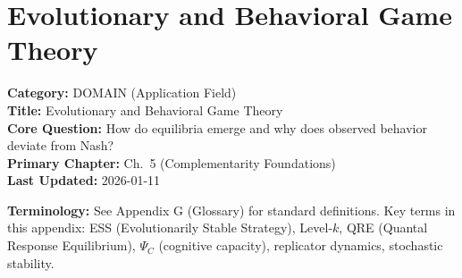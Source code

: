 \section{Evolutionary and Behavioral Game Theory}
\label{app:evolutionary-behavioral-gt}


\begin{tcolorbox}[colback=gray!5!white, colframe=gray!75!black,
    title=\textbf{Appendix: AD DOMAIN-EVGT}]
\textbf{Category:} DOMAIN (Application Field) \\
\textbf{Title:} Evolutionary and Behavioral Game Theory \\
\textbf{Core Question:} How do equilibria emerge and why does observed behavior deviate from Nash? \\
\textbf{Primary Chapter:} Ch.\ 5 (Complementarity Foundations) \\
\textbf{Last Updated:} 2026-01-11
\end{tcolorbox}

\begin{tcolorbox}[colback=gray!5!white, colframe=gray!50!black]
\textbf{Terminology:} See Appendix G (Glossary) for standard definitions.
Key terms in this appendix: ESS (Evolutionarily Stable Strategy), Level-$k$,
QRE (Quantal Response Equilibrium), $\Psi_C$ (cognitive capacity),
replicator dynamics, stochastic stability.
\end{tcolorbox}

